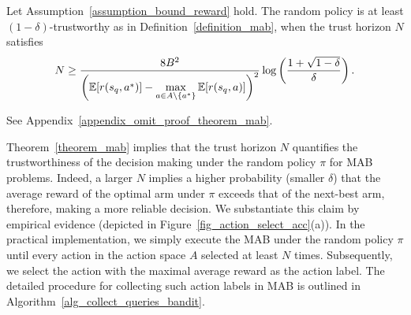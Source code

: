 \begin{theorem}[MAB]\label{theorem_mab}
    Let Assumption~\ref{assumption_bound_reward} hold. The random policy is at least $(1-\delta)$-trustworthy as in Definition~\ref{definition_mab}, when the trust horizon $N$ satisfies
    \begin{align}
        N \geq \frac{8B^2}{\left({\mathbb E}[r(s_q, a^*)] - \max\limits_{a \in A \setminus \{a^*\}} {\mathbb E}[r(s_q, a)] \right)^2} \log \left( \frac{1+\sqrt{1-\delta}}{\delta} \right).
    \end{align}
\end{theorem}
%
%
%
\begin{myproof}
    See Appendix~\ref{appendix_omit_proof_theorem_mab}.
\end{myproof}
%

%
%



Theorem~\ref{theorem_mab} implies that the trust horizon $N$ quantifies the trustworthiness of the decision making under the random policy $\pi$ for MAB problems. Indeed, a larger $N$ implies a higher probability (smaller $\delta$) that the average reward of the optimal arm under $\pi$ exceeds that of the next-best arm, therefore, making a more reliable decision. We substantiate this claim by empirical evidence (depicted in Figure~\ref{fig_action_select_acc}(a)).
%
%
%
In the practical implementation, we simply execute the MAB under the random policy $\pi$ until every action in the action space $A$ selected at least $N$ times.
%
Subsequently, we select the action with the maximal average reward as the action label. The detailed procedure for collecting such action labels in MAB is outlined in Algorithm~\ref{alg_collect_queries_bandit}.

